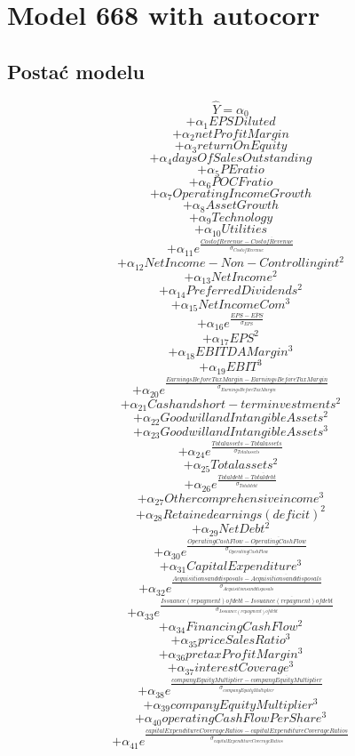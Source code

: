 \section{Model 668 with autocorr}
\subsection{Postać modelu}
\[ \hat{Y} = \alpha_0\]
\[+\alpha_{1}EPS Diluted\]
\[+\alpha_{2}netProfitMargin\]
\[+\alpha_{3}returnOnEquity\]
\[+\alpha_{4}daysOfSalesOutstanding\]
\[+\alpha_{5}PE ratio\]
\[+\alpha_{6}POCF ratio\]
\[+\alpha_{7}Operating Income Growth\]
\[+\alpha_{8}Asset Growth\]
\[+\alpha_{9}Technology\]
\[+\alpha_{10}Utilities\]
\[+\alpha_{11}e^{\frac{Cost of Revenue - \overline{Cost of Revenue}}{\sigma_{Cost of Revenue}}}\]
\[+\alpha_{12}Net Income - Non-Controlling int^2\]
\[+\alpha_{13}Net Income^2\]
\[+\alpha_{14}Preferred Dividends^2\]
\[+\alpha_{15}Net Income Com^3\]
\[+\alpha_{16}e^{\frac{EPS - \overline{EPS}}{\sigma_{EPS}}}\]
\[+\alpha_{17}EPS^2\]
\[+\alpha_{18}EBITDA Margin^3\]
\[+\alpha_{19}EBIT^3\]
\[+\alpha_{20}e^{\frac{Earnings Before Tax Margin - \overline{Earnings Before Tax Margin}}{\sigma_{Earnings Before Tax Margin}}}\]
\[+\alpha_{21}Cash and short-term investments^2\]
\[+\alpha_{22}Goodwill and Intangible Assets^2\]
\[+\alpha_{23}Goodwill and Intangible Assets^3\]
\[+\alpha_{24}e^{\frac{Total assets - \overline{Total assets}}{\sigma_{Total assets}}}\]
\[+\alpha_{25}Total assets^2\]
\[+\alpha_{26}e^{\frac{Total debt - \overline{Total debt}}{\sigma_{Total debt}}}\]
\[+\alpha_{27}Other comprehensive income^3\]
\[+\alpha_{28}Retained earnings (deficit)^2\]
\[+\alpha_{29}Net Debt^2\]
\[+\alpha_{30}e^{\frac{Operating Cash Flow - \overline{Operating Cash Flow}}{\sigma_{Operating Cash Flow}}}\]
\[+\alpha_{31}Capital Expenditure^3\]
\[+\alpha_{32}e^{\frac{Acquisitions and disposals - \overline{Acquisitions and disposals}}{\sigma_{Acquisitions and disposals}}}\]
\[+\alpha_{33}e^{\frac{Issuance (repayment) of debt - \overline{Issuance (repayment) of debt}}{\sigma_{Issuance (repayment) of debt}}}\]
\[+\alpha_{34}Financing Cash Flow^2\]
\[+\alpha_{35}priceSalesRatio^3\]
\[+\alpha_{36}pretaxProfitMargin^3\]
\[+\alpha_{37}interestCoverage^3\]
\[+\alpha_{38}e^{\frac{companyEquityMultiplier - \overline{companyEquityMultiplier}}{\sigma_{companyEquityMultiplier}}}\]
\[+\alpha_{39}companyEquityMultiplier^3\]
\[+\alpha_{40}operatingCashFlowPerShare^3\]
\[+\alpha_{41}e^{\frac{capitalExpenditureCoverageRatios - \overline{capitalExpenditureCoverageRatios}}{\sigma_{capitalExpenditureCoverageRatios}}}\]
